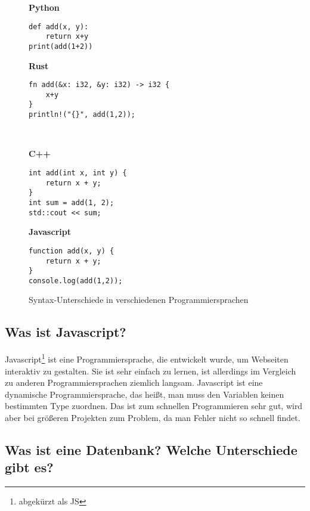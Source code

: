 \documentclass[a4paper, ngerman, 11pt]{scrartcl}
\begin{document}
\begin{figure}[ht]
\begin{minipage}{0.42\textwidth}
\textbf{Python}
\begin{verbatim}
def add(x, y):
    return x+y
print(add(1+2))
\end{verbatim}

\end{minipage}
\begin{minipage}{0.57\textwidth}
\textbf{Rust}
\begin{verbatim}
fn add(&x: i32, &y: i32) -> i32 {
    x+y
}
println!("{}", add(1,2));
\end{verbatim}
\end{minipage}\\[5mm]
\begin{minipage}{0.42\textwidth}

\textbf{C++}
\begin{verbatim}
int add(int x, int y) {
    return x + y;
}
int sum = add(1, 2);
std::cout << sum;
\end{verbatim}
\end{minipage}
\begin{minipage}{0.5\textwidth}
\textbf{Javascript}
\begin{verbatim}
function add(x, y) {
    return x + y;
}
console.log(add(1,2));
\end{verbatim}
\end{minipage}

\caption{Syntax-Unterschiede in verschiedenen Programmiersprachen\label{abb:syntax}}
\end{figure}

\subsection{Was ist Javascript?}

Javascript\footnote{abgekürzt als JS} ist eine Programmiersprache, die entwickelt wurde, um Webseiten interaktiv zu gestalten.
Sie ist sehr einfach zu lernen, ist allerdings im Vergleich zu anderen Programmiersprachen ziemlich langsam.
Javascript ist eine dynamische Programmiersprache, das heißt, man muss den Variablen keinen bestimmten Type zuordnen.
Das ist zum schnellen Programmieren sehr gut, wird aber bei größeren Projekten zum Problem, da man Fehler nicht so schnell findet.

\subsection[Wo ist Datenbank? (Sql vs NoSql)]{Was ist eine Datenbank? Welche Unterschiede gibt es?}
\end{document}
